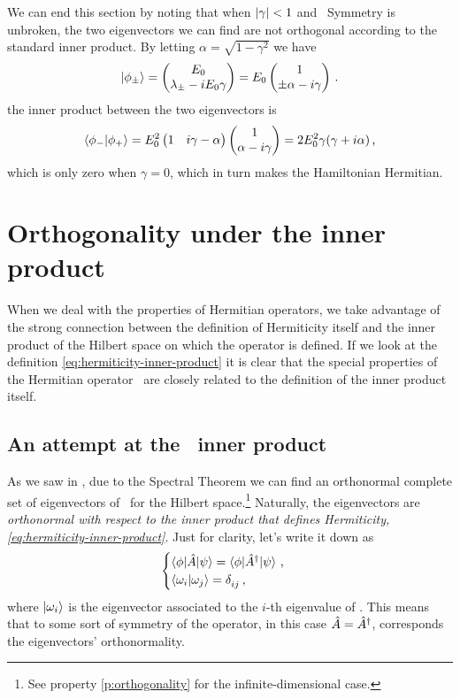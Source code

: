         We can end this section by noting that when $\abs{\gamma} < 1$ and \PT\ Symmetry is unbroken, the two eigenvectors we can find are not orthogonal according to the standard inner product. By letting $\alpha = \sqrt{1 - \gamma^2}$ we have 
        \begin{equation*}
            \ket{\phi_\pm} = \pmqty{E_0 \\ \lambda_\pm - i E_0 \gamma} = E_0 \pmqty{1 \\ \pm \alpha - i \gamma}
            \myperiod
        \end{equation*}
        the inner product between the two eigenvectors is
        \begin{equation}
            \label{eq:ex:non-orthogonality}
            \bra{\phi_-}\ket{\phi_+} = E_0^2 \pmqty{1 & i \gamma - \alpha}\pmqty{1 \\ \alpha -i \gamma} = 2 E_0^2 \gamma \pqty{\gamma + i \alpha}
            \mycomma
        \end{equation}
        which is only zero when $\gamma = 0$, which in turn makes the Hamiltonian Hermitian.

    \section{Orthogonality under the \texorpdfstring{\PT}{PT} inner product}\label{s:orthogonality}
        When we deal with the properties of Hermitian operators, we take advantage of the strong connection between the definition of Hermiticity itself and the inner product of the Hilbert space on which the operator is defined. If we look at the definition \eqref{eq:hermiticity-inner-product} it is clear that the special properties of the Hermitian operator \hA\ are closely related to the definition of the inner product itself.
        
        \subsection{An attempt at the \PT\ inner product}
            As we saw in , due to the Spectral Theorem we can find an orthonormal complete set of eigenvectors of \hA\ for the Hilbert space.\footnote{See property \ref{p:orthogonality} for the infinite-dimensional case.} Naturally, the eigenvectors are \emph{orthonormal with respect to the inner product that defines Hermiticity, \eqref{eq:hermiticity-inner-product}}. Just for clarity, let's write it down as
            \begin{equation*}
                \begin{cases}
                    \bra{\phi} \! \hA \! \ket{\psi} = \bra{\phi} \! \hA^\dag \! \ket{\psi}
                    \mycomma \\
                    \braket{\omega_i}{\omega_j} = \tensor{\delta}{_i_j}
                    \mycomma
                \end{cases}
            \end{equation*}
            where $\ket{\omega_i}$ is the eigenvector associated to the $i$-th eigenvalue of \hA. This means that to some sort of symmetry of the operator, in this case $\hat{A} = \hat{A}^\dag$, corresponds the eigenvectors' orthonormality.


